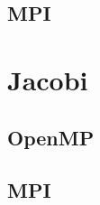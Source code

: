 \documentclass[letterpaper]{article}
\newcommand{\mypar}[1]{{\bf #1.}}
\begin{document}
\subsection{MPI}\label{sec:doitgenMPI}





\section{Jacobi}

\subsection{OpenMP}


\subsection{MPI}






\end{document}
